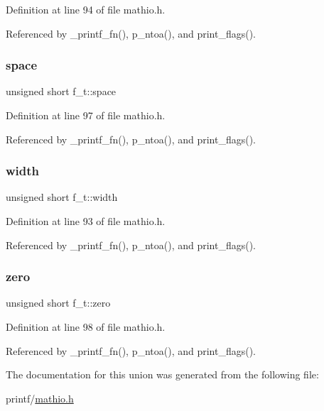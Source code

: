 Definition at line 94 of file mathio.\+h.



Referenced by \+\_\+printf\+\_\+fn(), p\+\_\+ntoa(), and print\+\_\+flags().

\mbox{\label{unionf__t_aba20a97e95d14a076e9c175989022717}} 
\subsubsection{\texorpdfstring{space}{space}}
{\footnotesize\ttfamily unsigned short f\+\_\+t\+::space}



Definition at line 97 of file mathio.\+h.



Referenced by \+\_\+printf\+\_\+fn(), p\+\_\+ntoa(), and print\+\_\+flags().

\mbox{\label{unionf__t_ad6b1584314c27653690552e95e1ed96f}} 
\subsubsection{\texorpdfstring{width}{width}}
{\footnotesize\ttfamily unsigned short f\+\_\+t\+::width}



Definition at line 93 of file mathio.\+h.



Referenced by \+\_\+printf\+\_\+fn(), p\+\_\+ntoa(), and print\+\_\+flags().

\mbox{\label{unionf__t_ac70397e87721255908299c190f3e5670}} 
\subsubsection{\texorpdfstring{zero}{zero}}
{\footnotesize\ttfamily unsigned short f\+\_\+t\+::zero}



Definition at line 98 of file mathio.\+h.



Referenced by \+\_\+printf\+\_\+fn(), p\+\_\+ntoa(), and print\+\_\+flags().



The documentation for this union was generated from the following file\+:\begin{DoxyCompactItemize}
\item 
printf/\hyperlink{mathio_8h}{mathio.\+h}\end{DoxyCompactItemize}
